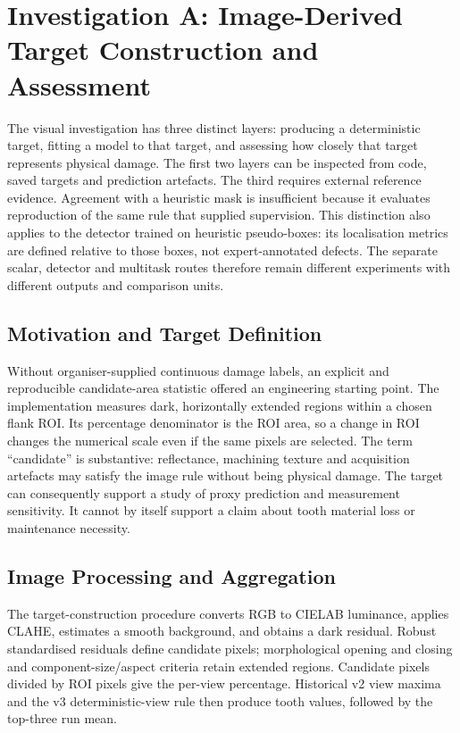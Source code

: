 \section{Investigation A: Image-Derived Target Construction and Assessment}
The visual investigation has three distinct layers: producing a deterministic target,
fitting a model to that target, and assessing how closely that target represents
physical damage. The first two layers can be inspected from code, saved targets and
prediction artefacts. The third requires external reference evidence. Agreement with a
heuristic mask is insufficient because it evaluates reproduction of the same rule that
supplied supervision. This distinction also applies to the detector trained on heuristic
pseudo-boxes: its localisation metrics are defined relative to those boxes, not
expert-annotated defects. The separate scalar, detector and multitask routes therefore
remain different experiments with different outputs and comparison units.

\subsection{Motivation and Target Definition}
Without organiser-supplied continuous damage labels, an explicit and reproducible
candidate-area statistic offered an engineering starting point. The implementation
measures dark, horizontally extended regions within a chosen flank ROI. Its percentage
denominator is the ROI area, so a change in ROI changes the numerical scale even if the
same pixels are selected. The term ``candidate'' is substantive: reflectance, machining
texture and acquisition artefacts may satisfy the image rule without being physical
damage. The target can consequently support a study of proxy prediction and measurement
sensitivity. It cannot by itself support a claim about tooth material loss or
maintenance necessity.

\subsection{Image Processing and Aggregation}
The target-construction procedure converts RGB to CIELAB luminance, applies CLAHE, estimates a
smooth background, and obtains a dark residual. Robust standardised residuals define
candidate pixels; morphological opening and closing and component-size/aspect criteria
retain extended regions. Candidate pixels divided by ROI pixels give the per-view
percentage. Historical v2 view maxima and the v3 deterministic-view rule then produce
tooth values, followed by the top-three run mean.

